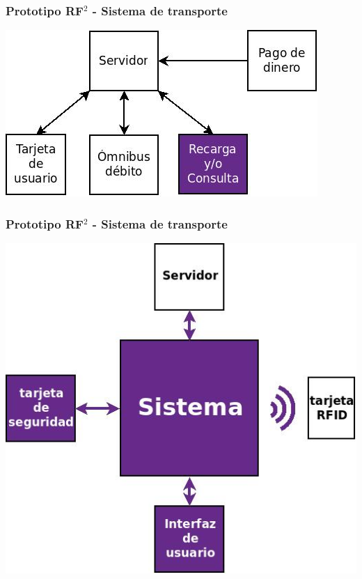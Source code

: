 \documentclass{beamer}
\begin{document}
\begin{frame}
	\frametitle{Prototipo RF$ ^{2} $ - Sistema de transporte}
	\begin{center}
		\includegraphics[scale=.5]{Imagenes/sistrans2.jpg}
	\end{center}
\end{frame}	

\begin{frame}
	\frametitle{Prototipo RF$ ^{2} $ - Sistema de transporte}
	\begin{center}
		\includegraphics[scale=.35]{Imagenes/diagrama_def.jpg}
	\end{center}
\end{frame}	
\end{document}
